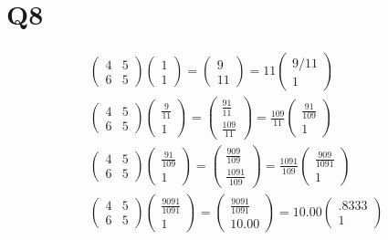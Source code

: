 \documentclass[11pt]{article} %
\begin{document}
\section{Q8 }
\begin{equation}
\begin{split}
\begin{pmatrix}
4 & 5 \\
6 & 5
\end{pmatrix}
\begin{pmatrix}
1\\
1
\end{pmatrix} 
= 
\begin{pmatrix}
9\\11
\end{pmatrix}
=11
\begin{pmatrix}
9/11\\
1
\end{pmatrix} \\
\begin{pmatrix}
4 & 5 \\
6 & 5
\end{pmatrix}
\begin{pmatrix}
\frac{9}{11}\\
1
\end{pmatrix} 
=
\begin{pmatrix}
\frac{91}{11}\\
\frac{109}{11}
\end{pmatrix} = \frac{109}{11}
\begin{pmatrix}
\frac{91}{109}\\
1
\end{pmatrix} \\
\begin{pmatrix}
4 & 5 \\
6 & 5
\end{pmatrix}
\begin{pmatrix}
\frac{91}{109}\\
1
\end{pmatrix} 
=
\begin{pmatrix}
\frac{909}{109}\\
\frac{1091}{109}
\end{pmatrix} = \frac{1091}{109}
\begin{pmatrix}
\frac{909}{1091}\\
1
\end{pmatrix} \\
\begin{pmatrix}
4 & 5 \\
6 & 5
\end{pmatrix}
\begin{pmatrix}
\frac{9091}{1091}\\
1
\end{pmatrix} 
=
\begin{pmatrix}
\frac{9091}{1091}\\
10.00
\end{pmatrix} = 10.00
\begin{pmatrix}
.8333\\
1
\end{pmatrix} 
\end{split}
\end{equation}
\end{document}
